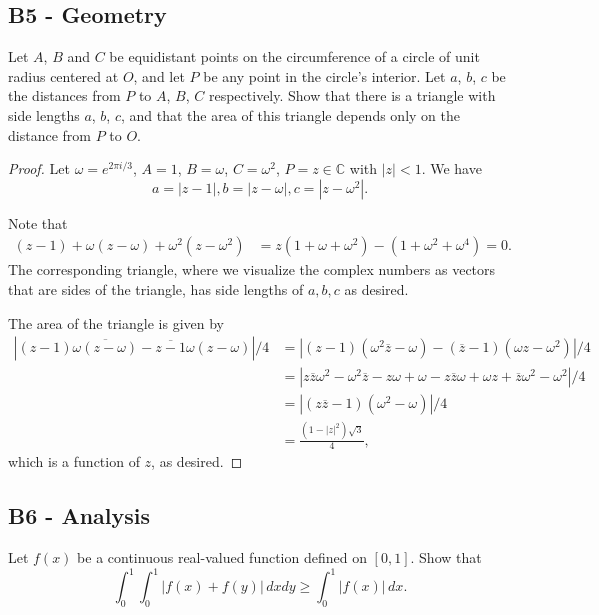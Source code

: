 \documentclass[11pt]{scrartcl}
\newcommand{\C}{\mathbb C}
\newcommand{\<}{\langle}
\renewcommand{\>}{\rangle}
\let \bar \overline
\begin{document}
\subsection{B5 - Geometry}
Let $A$, $B$ and $C$ be equidistant points on the circumference of a circle of unit radius centered at $O$, and let $P$ be any point in the circle's interior. Let $a$, $b$, $c$ be the distances from $P$ to $A$, $B$, $C$ respectively. Show that there is a triangle with side lengths $a$, $b$, $c$, and that the area of this triangle depends only on the distance from $P$ to $O$.

\begin{proof}
Let $\omega = e^{2\pi i / 3}$, $A = 1$, $B = \omega$, $C = \omega^2$, $P = z \in \C$ with $|z| < 1$.  We have 
$$a = |z - 1|, b = |z - \omega|,  c = |z - \omega^2|.$$

Note that 
\begin{align*}
(z - 1) + \omega(z - \omega) + \omega^2(z - \omega^2) &= z(1 + \omega + \omega^2) - (1 + \omega^2 + \omega^4) = 0.
\end{align*}
The corresponding triangle, where we visualize the complex numbers as vectors that are sides of the triangle, has side lengths of $a, b, c$ as desired.  

The area of the triangle is given by 
\begin{align*}
|(z-1) \bar{\omega(z - \omega)} - \bar{z - 1} \omega(z - \omega)|/4 &= |(z - 1) (\omega^2\bar{z} - \omega) - (\bar{z} - 1) (\omega z - \omega^2)|/4 \\
&= |z \bar{z} \omega^2 - \omega^2 \bar{z} - z\omega + \omega - z\bar{z} \omega + \omega z + \bar{z} \omega^2  - \omega^2|/4 \\
&= |(z \bar{z} - 1) (\omega^2 - \omega)|/4\\
&= \frac{(1 - |z|^2)\sqrt{3}}{4},
\end{align*}
which is a function of $z$, as desired. 
\end{proof}
\pagebreak
\subsection{B6 - Analysis}
Let $f(x)$ be a continuous real-valued function defined on $[0, 1]$.  Show that 
$$\int_{0}^1 \int_{0}^1 |f(x) + f(y)| \,dxdy \ge \int_0^1 |f(x)|\,dx.$$
\end{document}

